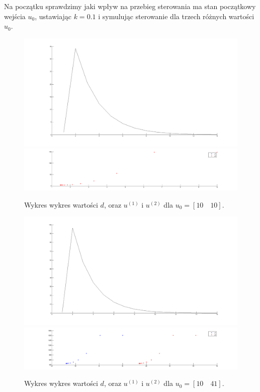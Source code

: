 \documentclass[a4paper,10pt]{article}
\begin{document}
\newpage Na początku sprawdzimy jaki wpływ na przebieg sterowania ma stan początkowy wejścia $u_0$, ustawiając $k=0.1$ i symulując sterowanie dla trzech różnych wartości $u_0$.
\begin{figure}[!h]
    \centering
	\includegraphics[width=120mm]{CW4-alg1fun1-u10_10-k01-d.png}
	\includegraphics[width=120mm]{CW4-alg1fun1-u10_10-k01-u.png}
	\caption{Wykres wykres wartości $d$, oraz $u^{(1)}$ i $u^{(2)}$ dla $u_0=[10 \quad 10]$.}
    \label{fig:Rysunek}
\end{figure}
\begin{figure}[!h]
    \centering
	\includegraphics[width=120mm]{CW4-alg1fun1-u10_41-k01-d.png}
	\includegraphics[width=120mm]{CW4-alg1fun1-u10_41-k01-u.png}
	\caption{Wykres wykres wartości $d$, oraz $u^{(1)}$ i $u^{(2)}$ dla $u_0=[10 \quad 41]$.}
    \label{fig:Rysunek}
\end{figure}
\end{document}

